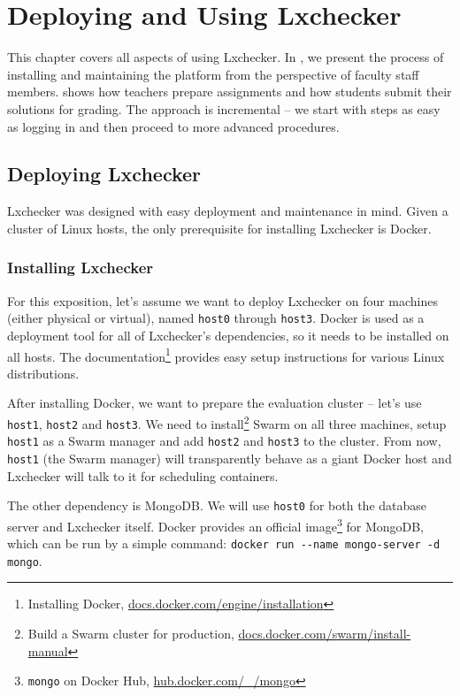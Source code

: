 \chapter{Deploying and Using Lxchecker}
\label{chapter:deployment-and-usage}

This chapter covers all aspects of using Lxchecker. In , we present the process of installing and maintaining the platform from the perspective of faculty staff members.  shows how teachers prepare assignments and how students submit their solutions for grading. The approach is incremental -- we start with steps as easy as logging in and then proceed to more advanced procedures.


\section{Deploying Lxchecker}
\label{sec:deployment}

Lxchecker was designed with easy deployment and maintenance in mind. Given a cluster of Linux hosts, the only prerequisite for installing Lxchecker is Docker.

\subsection{Installing Lxchecker}
\label{sub-sec:install-lxchecker}

For this exposition, let's assume we want to deploy Lxchecker on four machines (either physical or virtual), named \texttt{host0} through \texttt{host3}. Docker is used as a deployment tool for all of Lxchecker's dependencies, so it needs to be installed on all hosts. The documentation\footnote{Installing Docker, \url{docs.docker.com/engine/installation}} provides easy setup instructions for various Linux distributions.

After installing Docker, we want to prepare the evaluation cluster -- let's use \texttt{host1}, \texttt{host2} and \texttt{host3}. We need to install\footnote{Build a Swarm cluster for production, \url{docs.docker.com/swarm/install-manual}} Swarm on all three machines, setup \texttt{host1} as a Swarm manager and add \texttt{host2} and \texttt{host3} to the cluster. From now, \texttt{host1} (the Swarm manager) will transparently behave as a giant Docker host and Lxchecker will talk to it for scheduling containers.

The other dependency is MongoDB. We will use \texttt{host0} for both the database server and Lxchecker itself. Docker provides an official image\footnote{\texttt{mongo} on Docker Hub, \url{hub.docker.com/_/mongo}} for MongoDB, which can be run by a simple command: \texttt{docker run -{}-name mongo-server -d mongo}.

